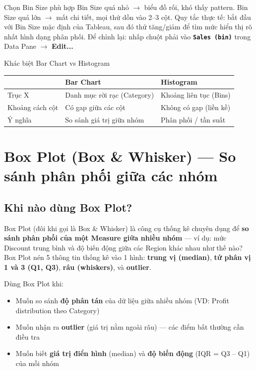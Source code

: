 \documentclass[12pt]{article}
\begin{document}
\begin{tipbox}{Chọn Bin Size phù hợp}
Bin Size quá nhỏ $\rightarrow$ biểu đồ rối, khó thấy pattern. Bin Size quá lớn $\rightarrow$ mất chi tiết, mọi thứ dồn vào 2--3 cột. Quy tắc thực tế: bắt đầu với Bin Size mặc định của Tableau, sau đó thử tăng/giảm để tìm mức hiển thị rõ nhất hình dạng phân phối. Để chỉnh lại: nhấp chuột phải vào \textbf{\texttt{Sales (bin)}} trong Data Pane $\rightarrow$ \textbf{Edit...}
\end{tipbox}

\begin{warningbox}{Khác biệt Bar Chart vs Histogram}
\renewcommand{\arraystretch}{1.3}
\begin{tabularx}{\linewidth}{l X X}
\toprule
& \textbf{Bar Chart} & \textbf{Histogram} \\
\midrule
Trục X & Danh mục rời rạc (Category) & Khoảng liên tục (Bins) \\
Khoảng cách cột & Có gap giữa các cột & Không có gap (liền kề) \\
Ý nghĩa & So sánh giá trị giữa nhóm & Phân phối / tần suất \\
\bottomrule
\end{tabularx}
\end{warningbox}

\section{Box Plot (Box \& Whisker) --- So sánh phân phối giữa các nhóm}

\subsection{Khi nào dùng Box Plot?}

\noindent Box Plot (đôi khi gọi là Box \& Whisker) là công cụ thống kê chuyên dụng để \textbf{so sánh phân phối của một Measure giữa nhiều nhóm} --- ví dụ: mức Discount trung bình và độ biến động giữa các Region khác nhau như thế nào? Box Plot nén 5 thông tin thống kê vào 1 hình: \textbf{trung vị (median)}, \textbf{tứ phân vị 1 và 3 (Q1, Q3)}, \textbf{râu (whiskers)}, và \textbf{outlier}.

\noindent Dùng Box Plot khi:
\begin{itemize}[nosep]
    \item Muốn so sánh \textbf{độ phân tán} của dữ liệu giữa nhiều nhóm (VD: Profit distribution theo Category)
    \item Muốn nhận ra \textbf{outlier} (giá trị nằm ngoài râu) --- các điểm bất thường cần điều tra
    \item Muốn biết \textbf{giá trị điển hình} (median) và \textbf{độ biến động} (IQR = Q3 -- Q1) của mỗi nhóm
\end{itemize}
\end{document}
